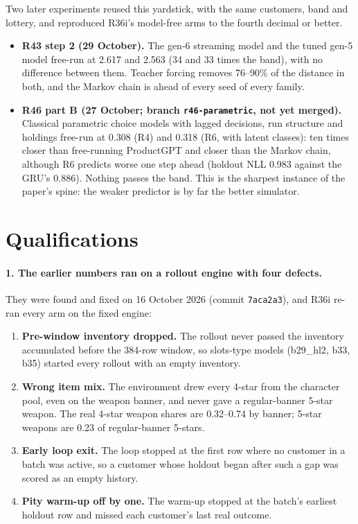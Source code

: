 \documentclass[11pt]{article}
\begin{document}
Two later experiments reused this yardstick, with the same customers, band and
lottery, and reproduced R36i's model-free arms to the fourth decimal or better.
\begin{itemize}
\item \textbf{R43 step 2 (29 October).} The gen-6 streaming model and the tuned
  gen-5 model free-run at 2.617 and 2.563 (34 and 33 times the band), with no
  difference between them. Teacher forcing removes 76--90\% of the distance in
  both, and the Markov chain is ahead of every seed of every family.
\item \textbf{R46 part B (27 October; branch \texttt{r46-parametric}, not yet
  merged).} Classical parametric choice models with lagged decisions, run
  structure and holdings free-run at 0.308 (R4) and 0.318 (R6, with latent
  classes): ten times closer than free-running ProductGPT and closer than the
  Markov chain, although R6 predicts worse one step ahead (holdout NLL 0.983
  against the GRU's 0.886). Nothing passes the band. This is the sharpest instance of the
  paper's spine: the weaker predictor is by far the better simulator.
\end{itemize}

\section{Qualifications}\label{sec:caveats}

\paragraph{1. The earlier numbers ran on a rollout engine with four defects.}
They were found and fixed on 16 October 2026 (commit \texttt{7aca2a3}), and
R36i re-ran every arm on the fixed engine:
\begin{enumerate}
\item \textbf{Pre-window inventory dropped.} The rollout never passed the
  inventory accumulated before the 384-row window, so slots-type models
  (b29\_hl2, b33, b35) started every rollout with an empty inventory.
\item \textbf{Wrong item mix.} The environment drew every 4-star from the
  character pool, even on the weapon banner, and never gave a regular-banner
  5-star weapon. The real 4-star weapon shares are 0.32--0.74 by banner; 5-star
  weapons are 0.23 of regular-banner 5-stars.
\item \textbf{Early loop exit.} The loop stopped at the first row where no
  customer in a batch was active, so a customer whose holdout began after such
  a gap was scored as an empty history.
\item \textbf{Pity warm-up off by one.} The warm-up stopped at the batch's
  earliest holdout row and missed each customer's last real outcome.
\end{enumerate}
\end{document}
